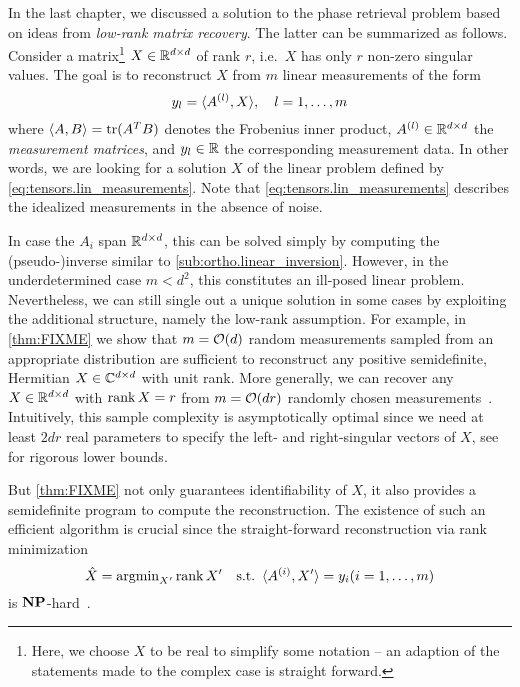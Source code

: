 In the last chapter, we discussed a solution to the phase retrieval problem based on ideas from \emph{low-rank matrix recovery}.
The latter can be summarized as follows.
Consider a matrix\footnote{%
  Here, we choose $X$ to be real to simplify some notation -- an adaption of the statements made to the complex case is straight forward.
}
$X \in {\mathbb{R}}^{d \times d}$ of rank $r$, i.e.\ $X$ has only $r$ non-zero singular values.
The goal is to reconstruct $X$ from $m$ linear measurements of the form
\[
  y_l = {\braket{A^{(l)}, X}}, \quad l=1,\ldots,m
  \label{eq:tensors.lin_measurements}
\]
where $\braket{A, B} = \operatorname{tr} ({{A}^T} B)$ denotes the Frobenius inner product, $A^{(l)} \in {\mathbb{R}}^{d \times d}$ the \emph{measurement matrices}, and $y_l \in {\mathbb{R}}$ the corresponding measurement data.
In other words, we are looking for a solution $X$ of the linear problem defined by \cref{eq:tensors.lin_measurements}.
Note that \cref{eq:tensors.lin_measurements} describes the idealized measurements in the absence of noise.

In case the $A_i$ span ${\mathbb{R}}^{d \times d}$, this can be solved simply by computing the (pseudo-)inverse similar to \cref{sub:ortho.linear_inversion}.
However, in the underdetermined case $m < d^{2}$, this constitutes an ill-posed linear problem.
Nevertheless, we can still single out a unique solution in some cases by exploiting the additional structure, namely the low-rank assumption.
For example, in \cref{thm:FIXME} we show that $m = {\mathcal{O}}(d)$ random measurements sampled from an appropriate distribution are sufficient to reconstruct any positive semidefinite, Hermitian $X \in {\mathbb{C}}^{d \times d}$ with unit rank.
More generally, we can recover any $X \in {\mathbb{R}}^{d \times d}$ with $\operatorname{rank} X = r$ from $m = {\mathcal{O}}(d r)$ randomly chosen measurements~\cite{Candes_2011_Tight,Kueng_2014_Low}.
Intuitively, this sample complexity is asymptotically optimal since we need at least $2 d r$ real parameters to specify the left- and right-singular vectors of $X$, see~\cite{Eldar_2012_Uniqueness,Li_2017_Optimal} for rigorous lower bounds.

But \cref{thm:FIXME} not only guarantees identifiability of $X$, it also provides a semidefinite program to compute the reconstruction.
The existence of such an efficient algorithm is crucial since the straight-forward reconstruction via rank minimization
\[
  \hat{X} = \operatorname{argmin}_{X'} \operatorname{rank} X' \quad\mathrm{s.t.}\ \braket{A^{(i)}, X'} = y_i (i = 1, \ldots, m)
\]
is $\mathbf{NP}$-hard~\cite{Mesbahi}.\\

